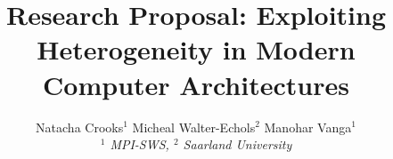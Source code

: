 

\newif \ifDraft\Drafttrue

\ifDraft
  \newcommand{\Comment}[1]{\textbf{\textsl{#1}}}
\else
  \newcommand{\Comment}[1]{\relax}
\fi

\newcommand{\gernot}[1]{\Comment{#1 [gernot]}}


\title{\vspace{-0.8cm}\textbf{
Research Proposal: Exploiting Heterogeneity in Modern Computer Architectures
}}

\author{
Natacha Crooks$^1$ \quad
Micheal Walter-Echols$^2$ \quad
Manohar Vanga$^1$
\\ \emph{$^1$ MPI-SWS, $^2$ Saarland University}
}
\date{\vspace{-12pt}}




\maketitle










\fontsize{8}{8.2}
\selectfont


\normalsize

